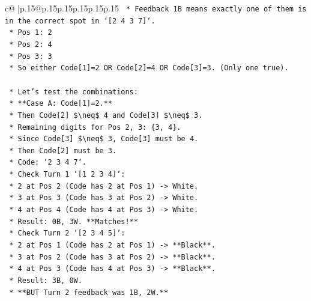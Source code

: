 \documentclass{article}
\begin{document}
{\begin{supertabular}{c@{$\;$}|p{.15\linewidth}@{}p{.15\linewidth}p{.15\linewidth}p{.15\linewidth}p{.15\linewidth}p{.15\linewidth}}
{{{\texttt{            *   Feedback 1B means exactly one of them is in the correct spot in `{[}2 4 3 7{]}`.} \\
\texttt{                *   Pos 1: 2} \\
\texttt{                *   Pos 2: 4} \\
\texttt{                *   Pos 3: 3} \\
\texttt{            *   So either Code{[}1{]}=2 OR Code{[}2{]}=4 OR Code{[}3{]}=3. (Only one true).} \\
\\ 
\texttt{        *   Let's test the combinations:} \\
\texttt{            *   **Case A: Code{[}1{]}=2.**} \\
\texttt{                *   Then Code{[}2{]} \$\textbackslash{}neq\$ 4 and Code{[}3{]} \$\textbackslash{}neq\$ 3.} \\
\texttt{                *   Remaining digits for Pos 2, 3: \{3, 4\}.} \\
\texttt{                *   Since Code{[}3{]} \$\textbackslash{}neq\$ 3, Code{[}3{]} must be 4.} \\
\texttt{                *   Then Code{[}2{]} must be 3.} \\
\texttt{                *   Code: `2 3 4 7`.} \\
\texttt{                *   Check Turn 1 `{[}1 2 3 4{]}`:} \\
\texttt{                    *   2 at Pos 2 (Code has 2 at Pos 1) {-}> White.} \\
\texttt{                    *   3 at Pos 3 (Code has 3 at Pos 2) {-}> White.} \\
\texttt{                    *   4 at Pos 4 (Code has 4 at Pos 3) {-}> White.} \\
\texttt{                    *   Result: 0B, 3W. **Matches!**} \\
\texttt{                *   Check Turn 2 `{[}2 3 4 5{]}`:} \\
\texttt{                    *   2 at Pos 1 (Code has 2 at Pos 1) {-}> **Black**.} \\
\texttt{                    *   3 at Pos 2 (Code has 3 at Pos 2) {-}> **Black**.} \\
\texttt{                    *   4 at Pos 3 (Code has 4 at Pos 3) {-}> **Black**.} \\
\texttt{                    *   Result: 3B, 0W.} \\
\texttt{                    *   **BUT Turn 2 feedback was 1B, 2W.**} \\
}}}
\end{supertabular}}
\end{document}

